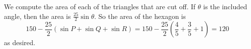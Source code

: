 We compute the area of each of the triangles that are cut off. If $\theta$ is the included angle, then the area is $\frac{25}{2}\sin\theta$. So the area of the hexagon is \[150-\frac{25}{2}\left(\sin P+\sin Q+\sin R\right)=150-\frac{25}{2}\left(\frac{4}{5}+\frac{3}{5}+1\right)=\boxed{120}\] as desired.